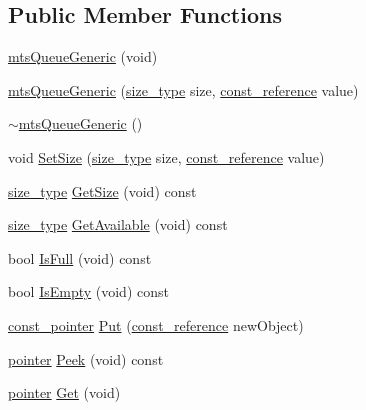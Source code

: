 \subsection*{Public Member Functions}
\begin{DoxyCompactItemize}
\item 
\hyperlink{classmts_queue_generic_a84e191a381314f2a44b713d23b09cafc}{mts\-Queue\-Generic} (void)
\item 
\hyperlink{classmts_queue_generic_a9235564499c2a66504dbcde97d82f10f}{mts\-Queue\-Generic} (\hyperlink{classmts_queue_generic_a3812ba15591f4a89a9df272391739e6f}{size\-\_\-type} size, \hyperlink{classmts_queue_generic_ad133c14265ada42f3347b90ccdd28cd3}{const\-\_\-reference} value)
\item 
\hyperlink{classmts_queue_generic_a21d824a56358714c93f36e43c516f3bd}{$\sim$mts\-Queue\-Generic} ()
\item 
void \hyperlink{classmts_queue_generic_ab0e40851168a01ec0d36cd16683d5971}{Set\-Size} (\hyperlink{classmts_queue_generic_a3812ba15591f4a89a9df272391739e6f}{size\-\_\-type} size, \hyperlink{classmts_queue_generic_ad133c14265ada42f3347b90ccdd28cd3}{const\-\_\-reference} value)
\item 
\hyperlink{classmts_queue_generic_a3812ba15591f4a89a9df272391739e6f}{size\-\_\-type} \hyperlink{classmts_queue_generic_a58241087cc4b9e64831ec1bde41a123c}{Get\-Size} (void) const 
\item 
\hyperlink{classmts_queue_generic_a3812ba15591f4a89a9df272391739e6f}{size\-\_\-type} \hyperlink{classmts_queue_generic_a73daa67e176f48c0f7a03c8d3b8d5348}{Get\-Available} (void) const 
\item 
bool \hyperlink{classmts_queue_generic_a2b1cf8ab9c5f99e1f22836411b73528f}{Is\-Full} (void) const 
\item 
bool \hyperlink{classmts_queue_generic_abdc2488d57e0a116ab3c90e8c988741b}{Is\-Empty} (void) const 
\item 
\hyperlink{classmts_queue_generic_a9b295370295fe53fee2f04a2ebd929b8}{const\-\_\-pointer} \hyperlink{classmts_queue_generic_a1b95d054af81e3cc2995f430fce6c31a}{Put} (\hyperlink{classmts_queue_generic_ad133c14265ada42f3347b90ccdd28cd3}{const\-\_\-reference} new\-Object)
\item 
\hyperlink{classmts_queue_generic_aa3ad46661cfdf9f182fd9c32315930a5}{pointer} \hyperlink{classmts_queue_generic_ad5fc929dba92870d7341fd3007ea4645}{Peek} (void) const 
\item 
\hyperlink{classmts_queue_generic_aa3ad46661cfdf9f182fd9c32315930a5}{pointer} \hyperlink{classmts_queue_generic_a6f4683c5e15ac84e8d63275eafde0067}{Get} (void)
\end{DoxyCompactItemize}
